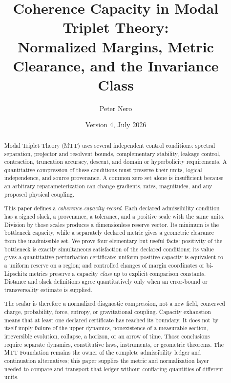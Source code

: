 \documentclass[11pt]{article}
\title{\vspace{-1em}
Coherence Capacity in Modal Triplet Theory:\\[0.25em]
\large Normalized Margins, Metric Clearance, and the Invariance Class}
\author{Peter Nero}
\date{Version 4, July 2026}
\theoremstyle{definition}
\theoremstyle{remark}
\begin{document}
\maketitle

\begin{abstract}
Modal Triplet Theory (MTT) uses several independent control conditions:
spectral separation, projector and resolvent bounds, complementary
stability, leakage control, contraction, truncation accuracy, descent, and
domain or hyperbolicity requirements.  A quantitative compression of these
conditions must preserve their units, logical independence, and source
provenance.  A common zero set alone is insufficient because an arbitrary
reparameterization can change gradients, rates, magnitudes, and any proposed
physical coupling.

This paper defines a \emph{coherence-capacity record}.  Each declared
admissibility condition has a signed slack, a provenance, a tolerance, and
a positive scale with the same units.  Division by those scales produces a
dimensionless reserve vector.  Its minimum is the bottleneck capacity, while
a separately declared metric gives a geometric clearance from the
inadmissible set.  We prove four elementary but useful facts: positivity of
the bottleneck is exactly simultaneous satisfaction of the declared
conditions; its value gives a quantitative perturbation certificate;
uniform positive capacity is equivalent to a uniform reserve on a region;
and controlled changes of margin coordinates or bi-Lipschitz metrics
preserve a capacity \emph{class} up to explicit comparison constants.
Distance and slack definitions agree quantitatively only when an error-bound
or transversality estimate is supplied.

The scalar is therefore a normalized diagnostic compression, not a new
field, conserved charge, probability, force, entropy, or gravitational
coupling.  Capacity exhaustion means that at least one declared certificate
has reached its boundary.  It does not by itself imply failure of the upper
dynamics, nonexistence of a measurable section, irreversible evolution,
collapse, a horizon, or an arrow of time.  Those conclusions require
separate dynamics, constitutive laws, instruments, or geometric theorems.
The MTT Foundation remains the owner of the complete
admissibility ledger and continuation alternatives; this paper supplies the
metric and normalization layer needed to compare and transport that ledger
without conflating quantities of different units.
\end{abstract}
\end{document}

